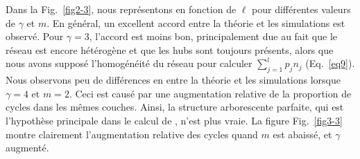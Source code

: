 Dans la Fig.~\ref{fig2-3}, nous représentons \nl en fonction de $\ell$ pour différentes valeurs de $\gamma$ et $m$. En général, un excellent accord entre la théorie et les simulations est observé. Pour $\gamma=3$, l'accord est moins bon, principalement due au fait que le réseau est encore hétérogène et que les hubs sont toujours présents, alors que nous avons supposé l'homogénéité du réseau pour calculer $\sum_{j=1}^{l} p_jn_j$ (Eq.~\eqref{eq9}).\\
Nous observons peu de différences en \nl entre la théorie et les simulations lorsque $ \gamma = 4 $ et $ m = 2 $. Ceci est causé par une augmentation relative de la proportion de cycles dans les mêmes couches. Ainsi, la structure arborescente parfaite, qui est l'hypothèse principale dans le calcul de \nl, n'est plus vraie. La figure Fig.~\ref{fig3-3} montre clairement l'augmentation relative des cycles quand $ m $ est abaissé, et $ \gamma $ augmenté.
